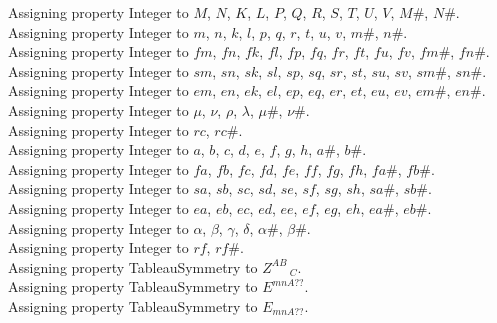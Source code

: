 \documentclass[11pt]{article}
\begin{document}
Assigning property Integer to $M$, $N$, $K$, $L$, $P$, $Q$, $R$, $S$, $T$, $U$, $V$, $M\#$, $N\#$.
\\
Assigning property Integer to $m$, $n$, $k$, $l$, $p$, $q$, $r$, $t$, $u$, $v$, $m\#$, $n\#$.
\\
Assigning property Integer to $fm$, $fn$, $fk$, $fl$, $fp$, $fq$, $fr$, $ft$, $fu$, $fv$, $fm\#$, $fn\#$.
\\
Assigning property Integer to $sm$, $sn$, $sk$, $sl$, $sp$, $sq$, $sr$, $st$, $su$, $sv$, $sm\#$, $sn\#$.
\\
Assigning property Integer to $em$, $en$, $ek$, $el$, $ep$, $eq$, $er$, $et$, $eu$, $ev$, $em\#$, $en\#$.
\\
Assigning property Integer to $\mu$, $\nu$, $\rho$, $\lambda$, $\mu\#$, $\nu\#$.
\\
Assigning property Integer to $rc$, $rc\#$.
\\
Assigning property Integer to $a$, $b$, $c$, $d$, $e$, $f$, $g$, $h$, $a\#$, $b\#$.
\\
Assigning property Integer to $fa$, $fb$, $fc$, $fd$, $fe$, $ff$, $fg$, $fh$, $fa\#$, $fb\#$.
\\
Assigning property Integer to $sa$, $sb$, $sc$, $sd$, $se$, $sf$, $sg$, $sh$, $sa\#$, $sb\#$.
\\
Assigning property Integer to $ea$, $eb$, $ec$, $ed$, $ee$, $ef$, $eg$, $eh$, $ea\#$, $eb\#$.
\\
Assigning property Integer to $\alpha$, $\beta$, $\gamma$, $\delta$, $\alpha\#$, $\beta\#$.
\\
Assigning property Integer to $rf$, $rf\#$.
\\
Assigning property TableauSymmetry to ${Z}^{A B}\,_{C}$.
\\
Assigning property TableauSymmetry to ${E}^{m n A??}$.
\\
Assigning property TableauSymmetry to ${E}_{m n A??}$.
\\
\end{document}
